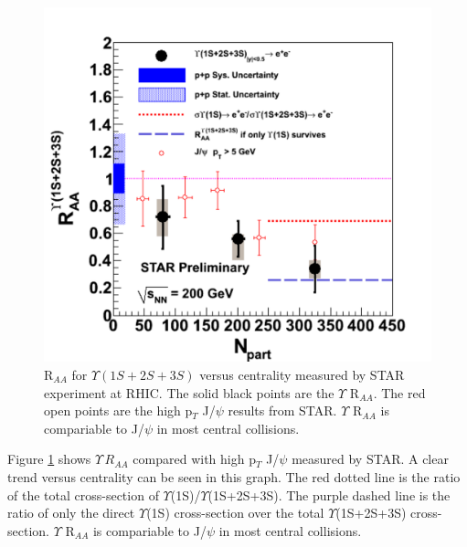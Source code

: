 \begin{figure}
  \includegraphics[width=\mediumfigwidth]{chap_QuarkoniaSurvey_figures/YStar2011_JPsiCompare}
  \caption[]{R$_{AA}$ for $\Upsilon(1S+2S+3S)$  versus centrality measured by STAR experiment at RHIC. The solid black points are the $\Upsilon$ R$_{AA}$. 
    The red open points are the high p$_T$ J/$\psi$ results from STAR. $\Upsilon$ R$_{AA}$ is compariable to J/$\psi$ in most central collisions.\cite{Star11}}
  \label{fig:YinSTAR2}
\end{figure}

Figure \ref{fig:YinSTAR2} shows $\Upsilon\,R_{AA}$ compared with high p$_T$ J/$\psi$ measured by STAR. A clear trend versus centrality can be seen in this graph.
The red dotted line is the ratio of the total cross-section of $\Upsilon$(1S)/$\Upsilon$(1S+2S+3S). The purple dashed line is the ratio of only the direct 
$\Upsilon$(1S) cross-section over the total $\Upsilon$(1S+2S+3S) cross-section. $\Upsilon$ R$_{AA}$ is compariable to J/$\psi$ in most central collisions. 

